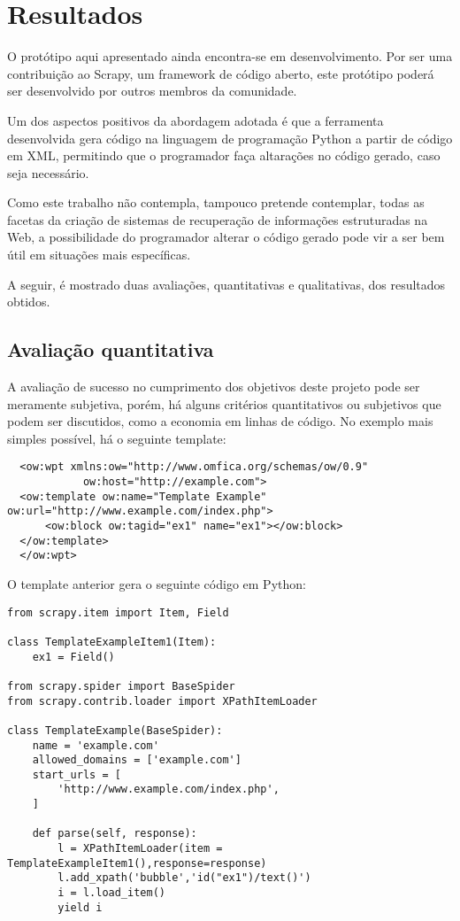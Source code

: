 \chapter{Resultados}

O protótipo aqui apresentado ainda encontra-se em desenvolvimento. Por ser uma contribuição ao Scrapy, um framework de código aberto, este protótipo poderá ser desenvolvido por outros membros da comunidade.

Um dos aspectos positivos da abordagem adotada é que a ferramenta desenvolvida gera código na linguagem de programação Python a partir de código em XML, permitindo que o programador faça altarações no código gerado, caso seja necessário. 

Como este trabalho não contempla, tampouco pretende contemplar, todas as facetas da criação de sistemas de recuperação de informações estruturadas na Web, a possibilidade do programador alterar o código gerado pode vir a ser bem útil em situações mais específicas.

A seguir, é mostrado duas avaliações, quantitativas e qualitativas, dos resultados obtidos.

\section{Avaliação quantitativa}

A avaliação de sucesso no cumprimento dos objetivos deste projeto pode ser meramente subjetiva, porém, há alguns critérios quantitativos ou subjetivos que podem ser discutidos, como a economia em linhas de código. No exemplo mais simples possível, há o seguinte template:

\begin{lstlisting}
  <ow:wpt xmlns:ow="http://www.omfica.org/schemas/ow/0.9"
            ow:host="http://example.com">
  <ow:template ow:name="Template Example" ow:url="http://www.example.com/index.php">
      <ow:block ow:tagid="ex1" name="ex1"></ow:block>
  </ow:template> 
  </ow:wpt>
\end{lstlisting}

O template anterior gera o seguinte código em Python:

\begin{lstlisting}
from scrapy.item import Item, Field

class TemplateExampleItem1(Item):
    ex1 = Field()

from scrapy.spider import BaseSpider
from scrapy.contrib.loader import XPathItemLoader

class TemplateExample(BaseSpider):
    name = 'example.com'
    allowed_domains = ['example.com']
    start_urls = [
        'http://www.example.com/index.php',
    ]
    
    def parse(self, response):
        l = XPathItemLoader(item = TemplateExampleItem1(),response=response)
        l.add_xpath('bubble','id("ex1")/text()') 
        i = l.load_item()
        yield i
\end{lstlisting}

